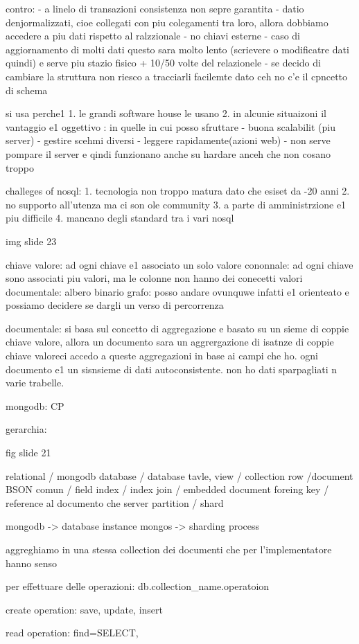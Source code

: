 contro:
- a linelo di transazioni consistenza non sepre garantita
- datio denjormalizzati, cioe collegati con piu colegamenti tra loro, allora dobbiamo accedere a piu dati rispetto al ralzzionale
- no chiavi esterne
- caso di aggiornamento di molti dati questo sara molto lento (scrievere o modificatre dati quindi) e serve piu stazio fisico + 10/50 volte del relazionele
- se decido di cambiare la struttura non riesco a tracciarli facilemte dato ceh no c'e il cpncetto di schema


si usa perche1 
1. le grandi software house le usano
2. in alcunie situaizoni il vantaggio e1 oggettivo : in quelle in cui posso sfruttare
- buona scalabilit (piu server)
- gestire scehmi diversi
- leggere rapidamente(azioni web)
- non serve pompare il server e qindi funzionano anche su hardare anceh che non cosano troppo


challeges of nosql:
1. tecnologia non troppo matura dato che esiset da -20 anni
2. no supporto all'utenza ma ci son ole community
3. a parte di amministrzione e1 piu difficile 
4. mancano degli standard tra i vari nosql


img slide 23

chiave valore: ad ogni chiave e1 associato un solo valore
cononnale: ad ogni chiave sono associati piu valori, ma le colonne non hanno dei conecetti valori 
documentale: albero binario 
grafo: posso andare ovunquwe infatti e1 orienteato e possiamo decidere se dargli un verso di percorrenza



documentale: si basa sul concetto di aggregazione e basato su un sieme di coppie chiave valore, allora un documento sara un aggrergazione di isatnze di coppie chiave valoreci accedo a queste aggregazioni in base ai campi che ho.
ogni documento e1 un sisnsieme di dati autoconsistente. non ho dati sparpagliati n varie trabelle.


mongodb: CP

gerarchia:

fig slide 21


relational / mongodb
database / database
tavle, view / collection
row /document BSON
comun / field
index / index
join / embedded document
foreing key / reference al documento che server
partition / shard

mongodb -> database instance
mongos -> sharding process

aggreghiamo in una stessa collection dei documenti che per l'implementatore hanno senso

per effettuare delle operazioni:
db.collection_name.operatoion

create operation:
save, update, insert

read operation:
find=SELECT, 
